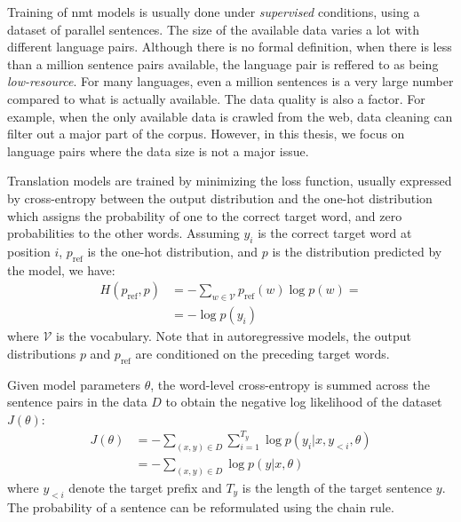 Training of \ac{nmt} models is usually done under \emph{supervised} conditions,
using a dataset of parallel sentences. The size of the available data varies a
lot with different language pairs. Although there is no formal definition, when
there is less than a million sentence pairs available, the language pair is
reffered to as being \emph{low-resource}. For many languages, even a million
sentences is a very large number compared to what is actually available. The
data quality is also a factor. For example, when the only available data is
crawled from the web, data cleaning can filter out a major part of the
corpus. However, in this thesis, we focus on language pairs where the data size
is not a major issue.

Translation models are trained by minimizing the loss function, usually
expressed by cross-entropy between the output distribution and the one-hot
distribution which assigns the probability of one to the correct target word,
and zero probabilities to the other words. Assuming $y_i$ is the correct target
word at position $i$, $p_{\text{ref}}$ is the one-hot distribution, and $p$ is
the distribution predicted by the model, we have:
%
\begin{equation}
  \begin{split}
    H(p_{\text{ref}}, p) &=  - \sum_{w \in \mathcal{V}} p_{\text{ref}}(w) \log p(w) = \\
    &=  - \log p(y_i)
  \end{split}
\end{equation}
%
where $\mathcal{V}$ is the vocabulary. Note that in autoregressive models, the
output distributions $p$ and $p_{\text{ref}}$ are conditioned on the preceding
target words.

Given model parameters $\theta$, the word-level cross-entropy is summed across
the sentence pairs in the data $D$ to obtain the negative log likelihood of the
dataset $J(\theta)$:
%
\begin{equation}
  \begin{split}
  J(\theta) &= - \sum_{(x, y) \in D} \sum_{i = 1}^{T_y} \log p(y_i | x, y_{<i}, \theta) \\
  &= - \sum_{(x, y) \in D} \log p(y | x, \theta)
  \end{split} \label{eq:loss}
\end{equation}
%
where $y_{<i}$ denote the target prefix and $T_{y}$ is the length of the target
sentence $y$. The probability of a sentence can be reformulated using the chain
rule.

